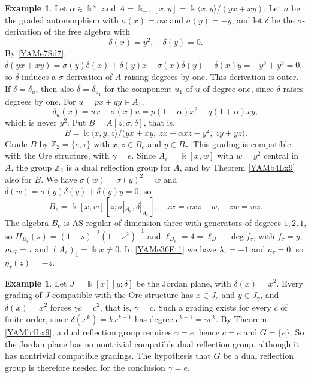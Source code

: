 \documentclass[reqno]{amsart}
\numberwithin{equation}{section}
\theoremstyle{definition}
\newtheorem{example}[equation]{Example}
\theoremstyle{remark}
\theoremstyle{plain}
\newcommand{\kk}{\Bbbk}
\begin{document}
\begin{example}\label{YAMex3Od5}
Let $\alpha\in\kk^\times$ and $A=\kk_{-1}[x,y]=\kk\langle x,y\rangle/(yx+xy)$. Let $\sigma$ be the graded automorphism with $\sigma(x)=\alpha x$ and $\sigma(y)=-y$, and let $\delta$ be the $\sigma$-derivation of the free algebra with
\[
\delta(x)=y^2,\quad\delta(y)=0.
\]
By \eqref{YAMe7Sd7}, $\delta(yx+xy)=\sigma(y)\delta(x)+\delta(y)x+\sigma(x)\delta(y)+\delta(x)y=-y^3+y^3=0$, so $\delta$ induces a $\sigma$-derivation of $A$ raising degrees by one. This derivation is outer. If $\delta=\delta_u$, then also $\delta=\delta_{u_1}$ for the component $u_1$ of $u$ of degree one, since $\delta$ raises degrees by one. For $u=px+qy\in A_1$,
\[
\delta_u(x)=ux-\sigma(x)u=p(1-\alpha)x^2-q(1+\alpha)xy,
\]
which is never $y^2$. Put $B=A[z;\sigma,\delta]$, that is,
\[
B=\kk\langle x,y,z\rangle/\big(yx+xy,\ zx-\alpha xz-y^2,\ zy+yz\big).
\]
Grade $B$ by $\mathbb Z_2=\{e,\tau\}$ with $x,z\in B_e$ and $y\in B_\tau$. This grading is compatible with the Ore structure, with $\gamma=e$. Since $A_e=\kk[x,w]$ with $w=y^2$ central in $A$, the group $\mathbb Z_2$ is a dual reflection group for $A$, and by Theorem \ref{YAMb4Lx9} also for $B$. We have $\sigma(w)=\sigma(y)^2=w$ and $\delta(w)=\sigma(y)\delta(y)+\delta(y)y=0$, so
\[
B_e=\kk[x,w][z;\sigma|_{A_e},\delta|_{A_e}],\quad zx=\alpha xz+w,\quad zw=wz.
\]
The algebra $B_e$ is AS regular of dimension three with generators of degrees $1,2,1$, so $H_{B_e}(s)=(1-s)^{-2}(1-s^2)^{-1}$ and $\ell_{B_e}=4=\ell_B+\deg f_\tau$, with $f_\tau=y$, $m_G=\tau$ and $(A_e)_1=\kk x\neq0$. In \eqref{YAMe36Et1} we have $\lambda_\tau=-1$ and $a_\tau=0$, so $\eta_\tau(z)=-z$.
\end{example}

\begin{example}\label{YAMex9Jp4}
Let $J=\kk[x][y;\delta]$ be the Jordan plane, with $\delta(x)=x^2$. Every grading of $J$ compatible with the Ore structure has $x\in J_c$ and $y\in J_\gamma$, and $\delta(x)=x^2$ forces $\gamma c=c^2$, that is, $\gamma=c$. Such a grading exists for every $c$ of finite order, since $\delta(x^k)=kx^{k+1}$ has degree $c^{k+1}=\gamma c^k$. By Theorem \ref{YAMb4Lx9}, a dual reflection group requires $\gamma=e$, hence $c=e$ and $G=\{e\}$. So the Jordan plane has no nontrivial compatible dual reflection group, although it has nontrivial compatible gradings. The hypothesis that $G$ be a dual reflection group is therefore needed for the conclusion $\gamma=e$.
\end{example}
\end{document}
